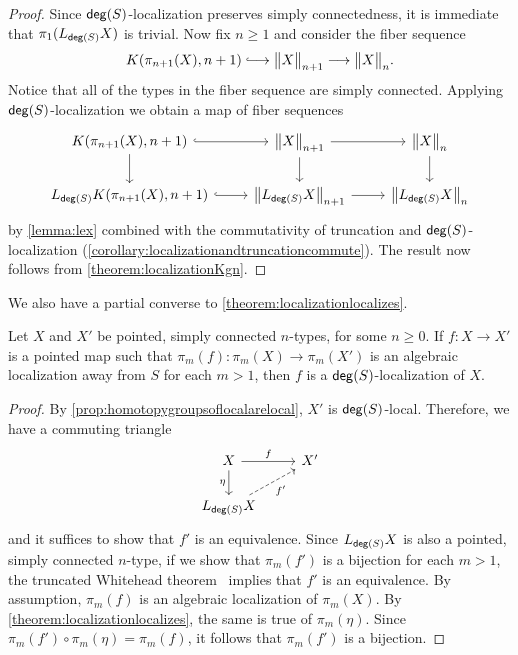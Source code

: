 \begin{proof}
    Since $\mathsf{deg}(S)$-localization preserves simply connectedness, it is immediate that $\pi_1(L_{\mathsf{deg}(S)} X)$ is trivial.
    Now fix $n \geq 1$ and consider the fiber sequence
    \[
        K(\pi_{n+1}(X),n+1) \longhookrightarrow \ttrunc{n+1}{X} \lra \ttrunc{n}{X}.
    \]
    Notice that all of the types in the fiber sequence are simply connected.
    Applying $\mathsf{deg}(S)$-localization we obtain a map of fiber sequences
\begin{equation*}
\begin{tikzcd}
K(\pi_{n+1}(X),n+1) \arrow[d] \arrow[r,hookrightarrow] & \ttrunc{n+1}{X} \arrow[d] \arrow[r] & \ttrunc{n}{X} \arrow[d] \\
L_{\degg(S)} K(\pi_{n+1}(X),n+1) \arrow[r,hookrightarrow] & \ttrunc{n+1}{L_{\degg(S)}X} \arrow[r] & \ttrunc{n}{L_{\degg(S)} X}
\end{tikzcd}
\end{equation*} 
    by \cref{lemma:lex} combined with the commutativity of truncation and
    $\mathsf{deg}(S)$-localization (\cref{corollary:localizationandtruncationcommute}).
    The result now follows from \cref{theorem:localizationKgn}.
\end{proof}

We also have a partial converse to \cref{theorem:localizationlocalizes}.

\begin{thm}\label{theorem:characterize-localization}
  Let $X$ and $X'$ be pointed, simply connected $n$-types, for some $n \geq 0$.
  If $f : X \to X'$ is a pointed map such that $\pi_m(f) : \pi_m(X) \to \pi_m(X')$ is
  an algebraic localization away from $S$ for each $m > 1$,
  then $f$ is a $\mathsf{deg}(S)$-localization of $X$.
\end{thm}

\begin{proof}
  By \cref{prop:homotopygroupsoflocalarelocal}, $X'$ is $\mathsf{deg}(S)$-local.
  Therefore, we have a commuting triangle
  \[
    \begin{tikzcd}
      X \arrow[r,"f"] \arrow[d,swap,"\eta"] & X' \\
      L_{\degg(S)} X \arrow[ur,dashed,swap,"f'"]
    \end{tikzcd}
  \]
  and it suffices to show that $f'$ is an equivalence.
  Since $L_{\mathsf{deg}(S)} X$ is also a pointed, simply connected $n$-type,
  if we show that $\pi_m(f')$ is a bijection for each $m > 1$,
  the truncated Whitehead theorem~\cite[Theorem~8.8.3]{hottbook} implies
  that $f'$ is an equivalence.
  By assumption, $\pi_m(f)$ is an algebraic localization of $\pi_m(X)$.
  By \cref{theorem:localizationlocalizes}, the same is true of $\pi_m(\eta)$.
  Since $\pi_m(f') \circ \pi_m(\eta) = \pi_m(f)$, it follows that
  $\pi_m(f')$ is a bijection.
\end{proof}

